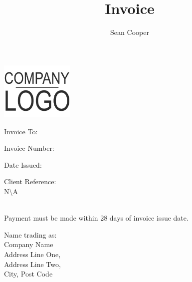 \documentclass[11pt,a4paper]{letter}
\author{Sean Cooper}
\title{Invoice}
\begin{document}
    \begin{center}
        \includegraphics[width=100pt]{logo.png}
    \end{center}
    \vspace{18pt}
    \fontsize{7pt}{9pt}\selectfont
    \begin{minipage}[t]{0.6415\textwidth}
    {\semibold Invoice To:}
        \begin{flushleft}
        \end{flushleft}
    \end{minipage}\hspace{12pt}
    \begin{minipage}[t]{0.1550\textwidth}
        \setlength{\parskip}{1em}
        {\semibold Invoice Number:}\\
        \par
        {\semibold Date Issued:}\\
    \end{minipage}\hspace{12pt}
    \begin{minipage}[t]{0.1350\textwidth}
    {\semibold Client Reference:}
        \\
        N\textbackslash A
    \end{minipage}
    \\
    \fontsize{7pt}{9pt}\selectfont
    {\semibold Payment must be made within 28 days of invoice issue date.}\par
    \vspace*{\fill}
    \begin{center}
    {\fontsize{7pt}{9pt}\selectfont
    Name trading as:\\
    {\semiboldit Company Name}\\
    Address Line One,\\
    Address Line Two,\\
    City, Post Code\\}
    \end{center}
\end{document}
